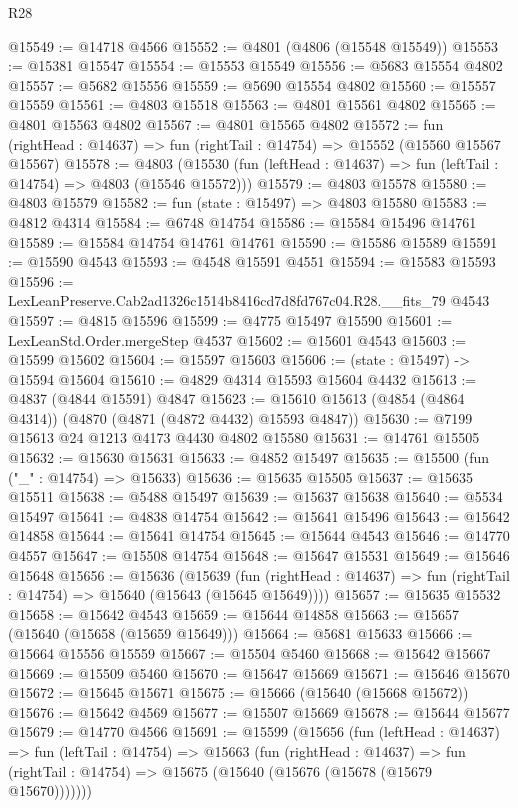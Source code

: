 \begin{lexlean}{R28}
\begin{coremodule}
@15549 := @14718 @4566
@15552 := @4801 (@4806 (@15548 @15549))
@15553 := @15381 @15547
@15554 := @15553 @15549
@15556 := @5683 @15554 @4802
@15557 := @5682 @15556
@15559 := @5690 @15554 @4802
@15560 := @15557 @15559
@15561 := @4803 @15518
@15563 := @4801 @15561 @4802
@15565 := @4801 @15563 @4802
@15567 := @4801 @15565 @4802
@15572 := fun (rightHead : @14637) => fun (rightTail : @14754) => @15552 (@15560 @15567 @15567)
@15578 := @4803
    (@15530 (fun (leftHead : @14637) => fun (leftTail : @14754) => @4803 (@15546 @15572)))
@15579 := @4803 @15578
@15580 := @4803 @15579
@15582 := fun (state : @15497) => @4803 @15580
@15583 := @4812 @4314
@15584 := @6748 @14754
@15586 := @15584 @15496 @14761
@15589 := @15584 @14754 @14761 @14761
@15590 := @15586 @15589
@15591 := @15590 @4543
@15593 := @4548 @15591 @4551
@15594 := @15583 @15593
@15596 := LexLeanPreserve.Cab2ad1326c1514b8416cd7d8fd767c04.R28.__fits_79 @4543
@15597 := @4815 @15596
@15599 := @4775 @15497 @15590
@15601 := LexLeanStd.Order.mergeStep @4537
@15602 := @15601 @4543
@15603 := @15599 @15602
@15604 := @15597 @15603
@15606 := (state : @15497) -> @15594 @15604
@15610 := @4829 @4314 @15593 @15604 @4432
@15613 := @4837 (@4844 @15591) @4847
@15623 := @15610 @15613 (@4854 (@4864 @4314)) (@4870 (@4871 (@4872 @4432) @15593 @4847))
@15630 := @7199 @15613 @24 @1213 @4173 @4430 @4802 @15580
@15631 := @14761 @15505
@15632 := @15630 @15631
@15633 := @4852 @15497
@15635 := @15500 (fun ("_" : @14754) => @15633)
@15636 := @15635 @15505
@15637 := @15635 @15511
@15638 := @5488 @15497
@15639 := @15637 @15638
@15640 := @5534 @15497
@15641 := @4838 @14754
@15642 := @15641 @15496
@15643 := @15642 @14858
@15644 := @15641 @14754
@15645 := @15644 @4543
@15646 := @14770 @4557
@15647 := @15508 @14754
@15648 := @15647 @15531
@15649 := @15646 @15648
@15656 := @15636
    (@15639
      (fun (rightHead : @14637) => fun (rightTail : @14754) => @15640 (@15643 (@15645 @15649))))
@15657 := @15635 @15532
@15658 := @15642 @4543
@15659 := @15644 @14858
@15663 := @15657 (@15640 (@15658 (@15659 @15649)))
@15664 := @5681 @15633
@15666 := @15664 @15556 @15559
@15667 := @15504 @5460
@15668 := @15642 @15667
@15669 := @15509 @5460
@15670 := @15647 @15669
@15671 := @15646 @15670
@15672 := @15645 @15671
@15675 := @15666 (@15640 (@15668 @15672))
@15676 := @15642 @4569
@15677 := @15507 @15669
@15678 := @15644 @15677
@15679 := @14770 @4566
@15691 := @15599
    (@15656
      (fun (leftHead : @14637) =>
      fun (leftTail : @14754) =>
      @15663
        (fun (rightHead : @14637) =>
        fun (rightTail : @14754) => @15675 (@15640 (@15676 (@15678 (@15679 @15670)))))))

\end{coremodule}
\end{lexlean}
